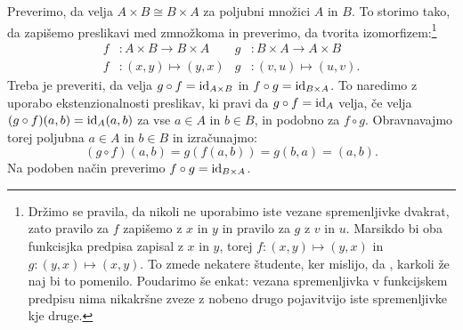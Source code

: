 Preverimo, da velja $A \times B \cong B \times A$ za poljubni množici $A$ in $B$. To
storimo tako, da zapišemo preslikavi med zmnožkoma in preverimo, da tvorita
izomorfizem:\footnote{Držimo se pravila, da nikoli ne uporabimo iste vezane spremenljivke
  dvakrat, zato pravilo za $f$ zapišemo z $x$ in $y$ in pravilo za $g$ z $v$ in $u$.
  Marsikdo bi oba funkcisjka predpisa zapisal z $x$ in $y$, torej
  $f : (x, y) \mapsto (y, x)$ in $g : (y, x) \mapsto (x, y)$. To zmede nekatere študente,
  ker mislijo, da , karkoli že
  naj bi to pomenilo. Poudarimo še enkat: vezana spremenljivka v funkcijskem predpisu nima
  nikakršne zveze z nobeno drugo pojavitvijo iste spremenljivke kje druge.}
%
\begin{align*}
  f &: A \times B \to B \times A &
  g &: B \times A \to A \times B \\
  f &: (x, y) \mapsto (y, x) &
  g &: (v, u) \mapsto (u, v).
\end{align*}
%
Treba je preveriti, da velja $g \circ f = \id[A \times B]$ in
$f \circ g = \id[B \times A]$. To naredimo z uporabo ekstenzionalnosti preslikav, ki pravi
da $g \circ f = \id[A]$ velja, če velja $(g \circ f)(a,b) = \id[A](a,b)$ za vse $a \in A$
in $b \in B$, in podobno za $f \circ g$. Obravnavajmo torej poljubna $a \in A$ in
$b \in B$ in izračunajmo:
%
\begin{equation*}
  (g \circ f)(a, b) =
  g (f (a, b)) = g (b, a) = (a, b).
\end{equation*}
%
Na podoben način preverimo $f \circ g = \id[B \times A]$.

